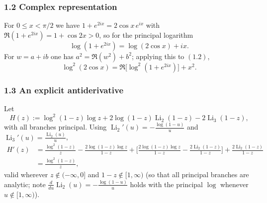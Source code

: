 \documentclass[11pt]{article}
\theoremstyle{remark}
\begin{document}
\subsubsection*{1.2 Complex representation}

For $0\le x<\pi/2$ we have $1+e^{2ix}=2\cos x\,e^{ix}$ with $\Re(1+e^{2ix})=1+\cos2x>0$, so for the principal logarithm
\begin{equation*}
\log(1+e^{2ix})=\log(2\cos x)+ix. \tag{1.2}
\end{equation*}
For $w=a+ib$ one has $a^2=\Re(w^2)+b^2$; applying this to $(1.2)$,
\begin{equation*}
\log^2(2\cos x)=\Re\big[\log^2(1+e^{2ix})\big]+x^2. \tag{1.3}
\end{equation*}

\subsubsection*{1.3 An explicit antiderivative}

Let
\[
H(z):=\log^2(1-z)\log z+2\log(1-z)\operatorname{Li}_2(1-z)-2\operatorname{Li}_3(1-z),
\]
with all branches principal. Using $\operatorname{Li}_2'(u)=-\frac{\log(1-u)}{u}$ and $\operatorname{Li}_3'(u)=\frac{\operatorname{Li}_2(u)}{u}$,
\begin{equation*}
\begin{aligned}
H'(z)&=\frac{\log^2(1-z)}{z}-\frac{2\log(1-z)\log z}{1-z}
+\Big[\frac{2\log(1-z)\log z}{1-z}-\frac{2\operatorname{Li}_2(1-z)}{1-z}\Big]+\frac{2\operatorname{Li}_2(1-z)}{1-z}\\
&=\frac{\log^2(1-z)}{z},
\end{aligned}
\tag{1.4}
\end{equation*}
valid wherever $z\notin(-\infty,0]$ and $1-z\notin[1,\infty)$ (so that all principal branches are analytic; note $\frac{d}{du}\operatorname{Li}_2(u)=-\frac{\log(1-u)}{u}$ holds with the principal $\log$ whenever $u\notin[1,\infty)$).
\end{document}
